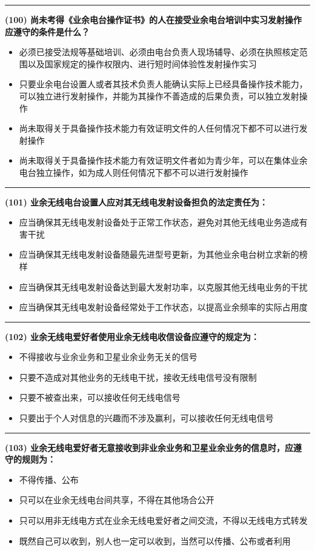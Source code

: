 \documentclass[twocolumn]{ctexart}  %
\begin{document}
\noindent\rule{0.5\textwidth}{1pt}
\heiti \textbf{(100) 尚未考得《业余电台操作证书》的人在接受业余电台培训中实习发射操作应遵守的条件是什么？} \songti {\color{gray} [LK0064] }
\begin{itemize}
	\item  必须已接受法规等基础培训、必须由电台负责人现场辅导、必须在执照核定范围以及国家规定的操作权限内、进行短时间体验性发射操作实习
	\item  只要业余电台设置人或者其技术负责人能确认实际上已经具备操作技术能力，可以独立进行发射操作，并能为其操作不善造成的后果负责，可以独立发射操作
	\item  尚未取得关于具备操作技术能力有效证明文件的人任何情况下都不可以进行发射操作
	\item  尚未取得关于具备操作技术能力有效证明文件者如为青少年，可以在集体业余电台独立操作，如为成人则任何情况下都不可以进行发射操作
\end{itemize}


\noindent\rule{0.5\textwidth}{1pt}
\heiti \textbf{(101) 业余无线电台设置人应对其无线电发射设备担负的法定责任为：} \songti {\color{gray} [LK0065] }
\begin{itemize}
	\item  应当确保其无线电发射设备处于正常工作状态，避免对其他无线电业务造成有害干扰
	\item  应当确保其无线电发射设备随最先进型号更新，为其他业余电台树立求新的榜样
	\item  应当确保其无线电发射设备达到最大发射功率，以克服其他无线电业务的干扰
	\item  应当确保其无线电发射设备经常处于工作状态，以提高业余频率的实际占用度
\end{itemize}


\noindent\rule{0.5\textwidth}{1pt}
\heiti \textbf{(102) 业余无线电爱好者使用业余无线电收信设备应遵守的规定为：} \songti {\color{gray} [LK0066] }
\begin{itemize}
	\item  不得接收与业余业务和卫星业余业务无关的信号
	\item  只要不造成对其他业务的无线电干扰，接收无线电信号没有限制
	\item  只要不被查出来，可以接收任何无线电信号
	\item  只要出于个人对信息的兴趣而不涉及赢利，可以接收任何无线电信号
\end{itemize}


\noindent\rule{0.5\textwidth}{1pt}
\heiti \textbf{(103) 业余无线电爱好者无意接收到非业余业务和卫星业余业务的信息时，应遵守的规则为：} \songti {\color{gray} [LK0067] }
\begin{itemize}
	\item  不得传播、公布
	\item  只可以在业余无线电台间共享，不得在其他场合公开
	\item  只可以用非无线电方式在业余无线电爱好者之间交流，不得以无线电方式转发
	\item  既然自己可以收到，别人也一定可以收到，当然可以传播、公布或者利用
\end{itemize}
\end{document}
